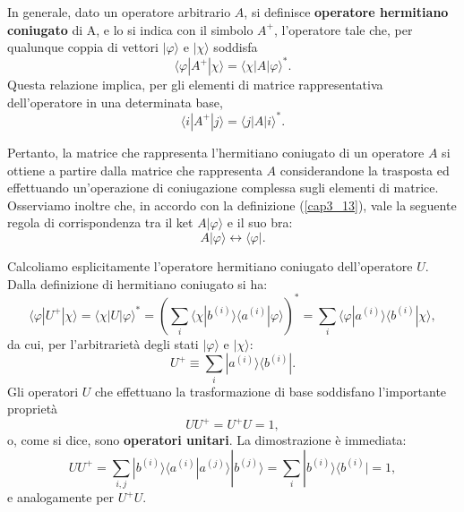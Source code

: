 \documentclass[a4paper,12pt,oneside]{book}
\begin{document}
In generale, dato un operatore arbitrario $A$, si definisce \textbf{operatore hermitiano coniugato} di A, e lo si indica con il simbolo $A^+$, l'operatore tale che, per qualunque coppia di vettori $| \varphi \rangle$ e $ | \chi \rangle $ soddisfa
	\begin{equation}
		\boxed{
			\langle \varphi | A^{+} | \chi \rangle = \langle \chi | A | \varphi \rangle ^* .
			}
	\label{cap3_13}
	\end{equation}
Questa relazione implica, per gli elementi di matrice rappresentativa dell'operatore in una determinata base,
	\begin{equation}
		\langle i | A^{+} | j \rangle = \langle j | A | i \rangle ^* .
	\end{equation}

Pertanto, la matrice che rappresenta l'hermitiano coniugato di un operatore $A$ si ottiene a partire dalla matrice che rappresenta $A$ considerandone la trasposta ed effettuando un'operazione di coniugazione complessa sugli elementi di matrice. Osserviamo inoltre che, in accordo con la definizione (\ref{cap3_13}), vale la seguente regola di corrispondenza tra il ket $A| \varphi \rangle$ e il suo bra:\\
	\begin{equation}
		\boxed{
			A| \varphi \rangle \leftrightarrow \langle \varphi | .
			}
	\end{equation}

Calcoliamo esplicitamente l'operatore hermitiano coniugato dell'operatore $U$. Dalla definizione di hermitiano coniugato si ha:
	\begin{equation}
		\langle \varphi | U^{+} | \chi \rangle = \langle \chi | U | \varphi \rangle ^* =  \left( \sum \limits_{i} \langle \chi | b^{(i)} \rangle \langle a^{(i)} | \varphi \rangle \right)^* =\sum \limits_{i} \langle \varphi | a^{(i)}\rangle \langle b^{(i)} | \chi \rangle ,
	\end{equation}
da cui, per l'arbitrarietà degli stati $| \varphi \rangle $ e $| \chi \rangle $:
	\begin{equation}
		\boxed{
			U^+ \equiv \sum \limits_{i} | a^{(i)} \rangle \langle b^{(i)} |  .
			}
	\end{equation}
Gli operatori $U$ che effettuano la trasformazione di base soddisfano l'importante proprietà
	\begin{equation}
		\boxed{\boxed{
			UU^+= U^+U=1 ,
			}}
	\end{equation}
o, come si dice, sono \textbf{operatori unitari}. La dimostrazione è immediata:
	\begin{equation}
		UU^+ = \sum\limits_{i,j}  | b^{(i)} \rangle \langle a^{(i)} | a^{(j)} \rangle | b^{(j)} \rangle = 
\sum\limits_{i} | b^{(i)} \rangle \langle b^{(i)} | = 1 ,
	\end{equation}
e analogamente per $U^+U$.\\
\end{document}
